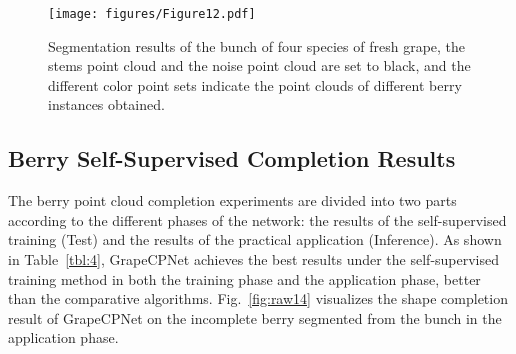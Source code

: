 \documentclass[12pt]{article}
\begin{document}
\begin{figure}[hbt!]
    \centering
    \texttt{[image: figures/Figure12.pdf]}
    \caption{Segmentation results of the bunch of four species of fresh grape, the stems point cloud and the noise point cloud are set to black, and the different color point sets indicate the point clouds of different berry instances obtained.}
    \label{fig:raw13}
\end{figure}

\subsection{Berry Self-Supervised Completion Results}
\label{sec:32}

The berry point cloud completion experiments are divided into two parts according to the different phases of the network: 
the results of the self-supervised training (Test) and the results of the practical application (Inference).
As shown in Table~\ref{tbl:4}, 
GrapeCPNet achieves the best results under the self-supervised training method in both the training phase and the application phase, better than the comparative algorithms. Fig.~\ref{fig:raw14} visualizes the shape completion result of GrapeCPNet on the incomplete berry segmented from the bunch in the application phase.
\end{document}
